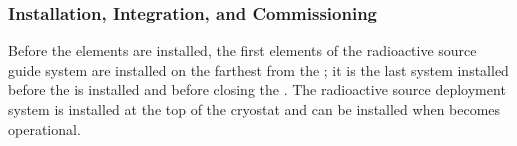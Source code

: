 \begin{comment}
\begin{dunetable}
[Calibration risks3]
{p{0.03\linewidth}p{0.4\linewidth}p{0.05\linewidth}p{0.4\linewidth}}
{tab:fdgen-calib-risks3}
{Possible risk scenarios for the radioactive source system along with mitigation strategies. The level of risk is indicated by letters ``H'', ``M'', and ``L'' corresponding to high, medium and low level risks.}   
No. & Risk  & Risk Level & Mitigation Strategy  \\ \toprowrule

10 & The deployed radioactive source can potentially swing into detector elements if not controlled or if large currents exist in the \dword{lar} & M & Guide-wires mitigate this risk.\\ \colhline

11 & Radioactivity could leak into the detector during a deployment. & L & Rigorous source certification under large pressure and cryogenic temperatures mitigates this risk.\\ \colhline

12 & The source could get stuck or lost in the detector. & L & Fish-line an order of magnitude stronger than needed to hold the weight, round edges of the moderator and a torque limit of the stepper motor will mitigate this risk.\\ \colhline

13 & Oxygen and nitrogen could get into the \dword{lar} in case the purge-box has a small leak. & M & Leak checks before deployments, purge-box in under-pressure inside w/r to the detector, will mitigate this risk.\\ \colhline

14 & Light could couple into the detector. & M &
Light-tight purge-box, internally equipped with an infra-red camera for visual checks will mitigate this risk.\\ \colhline

15 & The source activity can activate the cryostat insulation. & L & Detailed simulations/activation measurements can say what is a tolerable activity and the source activity can be chosen to be below that. \\ \colhline
\end{dunetable}
\end{comment}

\subsubsection{Installation, Integration, and Commissioning}
Before the  elements are installed, the first elements of the radioactive source guide system are installed on the \endwall farthest from the ; it is the last system installed
before the  is installed and before closing the . The radioactive source deployment system is installed at the top of the cryostat and can be installed when  becomes operational.


